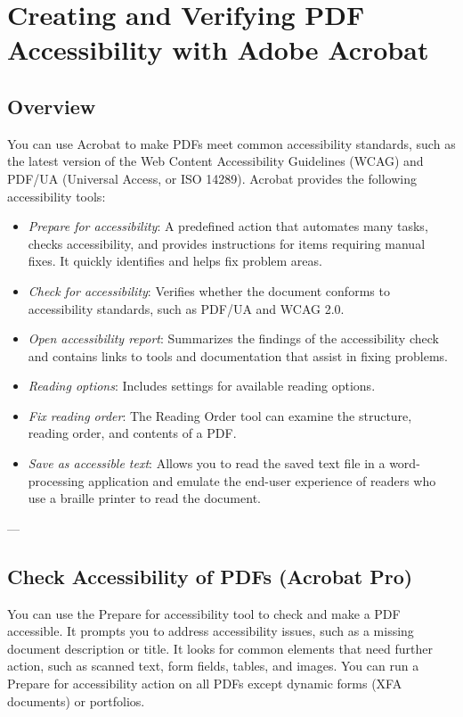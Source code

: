 \chapter{Creating and Verifying PDF Accessibility with Adobe Acrobat}
\label{chap:pdf-accessibility-acrobat}

\section{Overview}
You can use Acrobat to make PDFs meet common accessibility standards, such as the latest version of the Web Content Accessibility Guidelines (WCAG) and PDF/UA (Universal Access, or ISO 14289)\cite{AdobeHelpX}. Acrobat provides the following accessibility tools:
\begin{itemize}
    \item \emph{Prepare for accessibility}: A predefined action that automates many tasks, checks accessibility, and provides instructions for items requiring manual fixes. It quickly identifies and helps fix problem areas.
    \item \emph{Check for accessibility}: Verifies whether the document conforms to accessibility standards, such as PDF/UA and WCAG 2.0.
    \item \emph{Open accessibility report}: Summarizes the findings of the accessibility check and contains links to tools and documentation that assist in fixing problems.
    \item \emph{Reading options}: Includes settings for available reading options.
    \item \emph{Fix reading order}: The Reading Order tool can examine the structure, reading order, and contents of a PDF.
    \item \emph{Save as accessible text}: Allows you to read the saved text file in a word-processing application and emulate the end-user experience of readers who use a braille printer to read the document.
\end{itemize}

---

\section{Check Accessibility of PDFs (Acrobat Pro)}
You can use the Prepare for accessibility tool to check and make a PDF accessible. It prompts you to address accessibility issues, such as a missing document description or title. It looks for common elements that need further action, such as scanned text, form fields, tables, and images. You can run a Prepare for accessibility action on all PDFs except dynamic forms (XFA documents) or portfolios\footnotemark[1].

